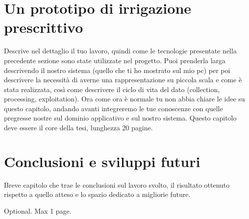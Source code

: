 \documentclass[12pt,a4paper,openright,twoside]{book}
\begin{document}
\chapter{Un prototipo di irrigazione prescrittivo}
Descrive nel dettaglio il tuo lavoro, quindi come le tecnologie presentate nella precedente sezione sono state utilizzate nel progetto. Puoi prenderla larga descrivendo il nostro sistema (quello che ti ho mostrato sul mio pc) per poi descrivere la necessità di averne una rappresentazione su piccola scala e come è stata realizzata, così come descrivere il ciclo di vita del dato (collection, processing, exploitation). Ora come ora è normale tu non abbia chiare le idee su questo capitolo, andando avanti integreremo le tue conoscenze con quelle pregresse nostre sul dominio applicativo e sul nostro sistema. Questo capitolo deve essere il core della tesi, lunghezza 20 pagine.

\chapter{Conclusioni e sviluppi futuri}

Breve capitolo che trae le conclusioni sul lavoro svolto, il risultato ottenuto rispetto a quello atteso e lo spazio dedicato a migliorie future.

%
%

\backmatter




\begin{acknowledgements} %
    Optional. Max 1 page.
\end{acknowledgements}
\end{document}
